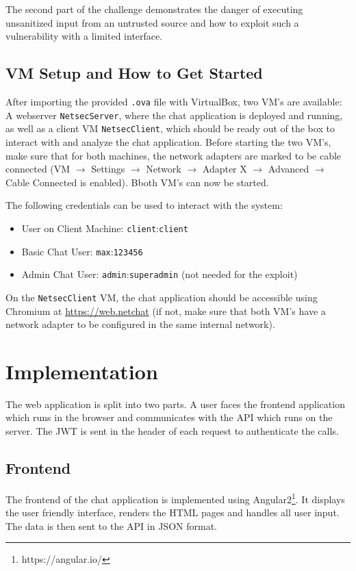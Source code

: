 \documentclass[12pt,a4paper]{article}
\newcommand{\code}[1]{\texttt{#1}}
\begin{document}
The second part of the challenge demonstrates the danger of executing unsanitized input from an untrusted source and how to exploit such a vulnerability with a limited interface.

\subsection{VM Setup and How to Get Started}
After importing the provided \code{.ova} file with VirtualBox, two VM's are available: A webserver \code{NetsecServer}, where the chat application is deployed and running, as well as a client VM \code{NetsecClient}, which should be ready out of the box to interact with and analyze the chat application. Before starting the two VM's, make sure that for both machines, the network adapters are marked to be cable connected (VM $\rightarrow$ Settings $\rightarrow$ Network $\rightarrow$ Adapter X $\rightarrow$ Advanced $\rightarrow$ Cable Connected is enabled). Bboth VM's can now be started.

The following credentials can be used to interact with the system:
\begin{itemize}
	\item User on Client Machine: \code{client}:\code{client}
	\item Basic Chat User: \code{max}:\code{123456}
	\item Admin Chat User: \code{admin}:\code{superadmin} (not needed for the exploit)
\end{itemize}

On the \code{NetsecClient} VM, the chat application should be accessible using Chromium at \url{https://web.netchat} (if not, make sure that both VM's have a network adapter to be configured in the same internal network).

\section{Implementation}

The web application is split into two parts. A user faces the frontend application which runs in the browser and communicates with the API which runs on the server. The JWT is sent in the header of each request to authenticate the calls.

\subsection{Frontend}
The frontend of the chat application is implemented using Angular2\footnote{https://angular.io/}. It displays the user friendly interface, renders the HTML pages and handles all user input. The data is then sent to the API in JSON format. 
 
\end{document}
